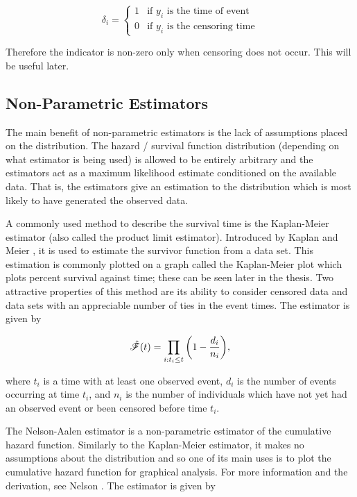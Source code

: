 \begin{equation}
\delta_i=
\begin{cases} 
      1 & \text{if $y_i$ is the time of event} \\
      0 & \text{if $y_i$ is the censoring time}
\end{cases}
\end{equation}

Therefore the indicator is non-zero only when censoring does not occur. This will be useful later.

\subsection{Non-Parametric Estimators}\label{non-parametric-estimators}

The main benefit of non-parametric estimators is the lack of assumptions placed on the distribution. The hazard / survival function distribution (depending on what estimator is being used) is allowed to be entirely arbitrary and the estimators act as a maximum likelihood estimate conditioned on the available data. That is, the estimators give an estimation to the distribution which is most likely to have generated the observed data. 

A commonly used method to describe the survival time is the Kaplan-Meier estimator (also called the product limit estimator). Introduced by Kaplan and Meier , it is used to estimate the survivor function from a data set. This estimation is commonly plotted on a graph called the Kaplan-Meier plot which plots percent survival against time; these can be seen later in the thesis. Two attractive properties of this method are its ability to consider censored data and data sets with an appreciable number of ties in the event times. The estimator is given by

\begin{equation}
    \hat{\mathscr{F}}(t)=\prod_{i:t_i\leq t}\bigg(1-\frac{d_i}{n_i}\bigg),
\end{equation}

where $t_i$ is a time with at least one observed event, $d_i$ is the number of events occurring at time $t_i$, and $n_i$ is the number of individuals which have not yet had an observed event or been censored before time $t_i$.

The Nelson-Aalen estimator is a non-parametric estimator of the cumulative hazard function. Similarly to the Kaplan-Meier estimator, it makes no assumptions about the distribution and so one of its main uses is to plot the cumulative hazard function for graphical analysis. For more information and the derivation, see Nelson . The estimator is given by

